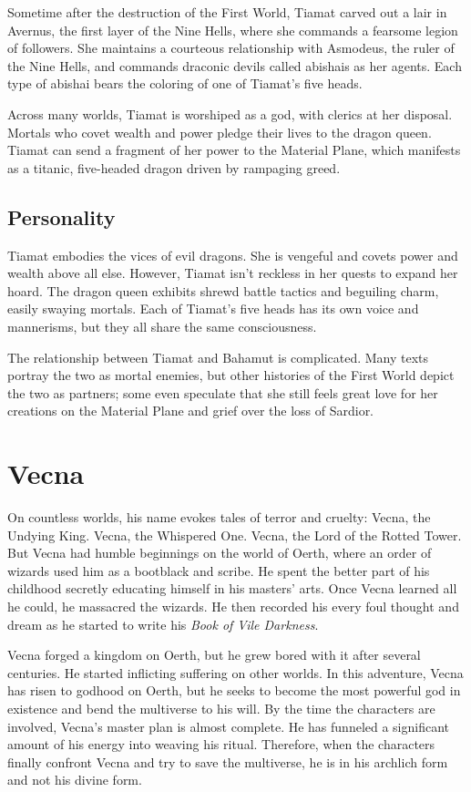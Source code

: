 \documentclass[10pt,a4paper,twoside,bg=print,twocolumn,openany,nodeprecatedcode]{dndbook}
\begin{document}
Sometime after the destruction of the First World, Tiamat carved out a lair in Avernus, the first layer of the Nine Hells, where she commands a fearsome legion of followers. She maintains a courteous relationship with Asmodeus, the ruler of the Nine Hells, and commands draconic devils called abishais as her agents. Each type of abishai bears the coloring of one of Tiamat's five heads.

Across many worlds, Tiamat is worshiped as a god, with clerics at her disposal. Mortals who covet wealth and power pledge their lives to the dragon queen. Tiamat can send a fragment of her power to the Material Plane, which manifests as a titanic, five-headed dragon driven by rampaging greed.

\subsection{Personality}
Tiamat embodies the vices of evil dragons. She is vengeful and covets power and wealth above all else. However, Tiamat isn't reckless in her quests to expand her hoard. The dragon queen exhibits shrewd battle tactics and beguiling charm, easily swaying mortals. Each of Tiamat's five heads has its own voice and mannerisms, but they all share the same consciousness.

The relationship between Tiamat and Bahamut is complicated. Many texts portray the two as mortal enemies, but other histories of the First World depict the two as partners; some even speculate that she still feels great love for her creations on the Material Plane and grief over the loss of Sardior.

\section{Vecna}
On countless worlds, his name evokes tales of terror and cruelty: Vecna, the Undying King. Vecna, the Whispered One. Vecna, the Lord of the Rotted Tower. But Vecna had humble beginnings on the world of Oerth, where an order of wizards used him as a bootblack and scribe. He spent the better part of his childhood secretly educating himself in his masters' arts. Once Vecna learned all he could, he massacred the wizards. He then recorded his every foul thought and dream as he started to write his \textit{Book of Vile Darkness}.

Vecna forged a kingdom on Oerth, but he grew bored with it after several centuries. He started inflicting suffering on other worlds. In this adventure, Vecna has risen to godhood on Oerth, but he seeks to become the most powerful god in existence and bend the multiverse to his will. By the time the characters are involved, Vecna's master plan is almost complete. He has funneled a significant amount of his energy into weaving his ritual. Therefore, when the characters finally confront Vecna and try to save the multiverse, he is in his archlich form and not his divine form.
\end{document}

